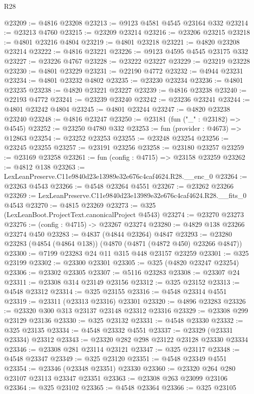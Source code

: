 \begin{lexlean}{R28}
\begin{coremodule}
@23209 := @4816 @23208
@23213 := @9123 @4581 @4545 @23164 @332
@23214 := @23213 @4760
@23215 := @23209 @23214
@23216 := @23206 @23215
@23218 := @4801 @23216 @4804
@23219 := @4801 @23218
@23221 := @4820 @23208 @23214
@23222 := @4816 @23221
@23226 := @9123 @4595 @4545 @23175 @332
@23227 := @23226 @4767
@23228 := @23222 @23227
@23229 := @23219 @23228
@23230 := @4801 @23229
@23231 := @22190 @4772
@23232 := @4944 @23231
@23234 := @4801 @23232 @4802
@23235 := @23230 @23234
@23236 := @4801 @23235
@23238 := @4820 @23221 @23227
@23239 := @4816 @23238
@23240 := @22193 @4772
@23241 := @23239 @23240
@23242 := @23236 @23241
@23244 := @4801 @23242 @4804
@23245 := @4801 @23244
@23247 := @4820 @23238 @23240
@23248 := @4816 @23247
@23250 := @23181 (fun ("_" : @23182) => @4545)
@23252 := @23250 @4780 @332
@23253 := fun (provider : @4673) => @12863
@23254 := @23252 @23253
@23255 := @23248 @23254
@23256 := @23245 @23255
@23257 := @23191 @23256
@23258 := @23180 @23257
@23259 := @23169 @23258
@23261 := fun (config : @4715) => @23158 @23259
@23262 := @4812 @138
@23263 := LexLeanPreserve.C11e9840d23e13989e32e676c4caf4624.R28.__enc_0
@23264 := @23263 @4543
@23266 := @4548 @23264 @4551
@23267 := @23262 @23266
@23269 := LexLeanPreserve.C11e9840d23e13989e32e676c4caf4624.R28.__fits_0 @4543
@23270 := @4815 @23269
@23273 := @325 (LexLeanBoot.ProjectText.canonicalProject @4543)
@23274 := @23270 @23273
@23276 := (config : @4715) -> @23267 @23274
@23280 := @4829 @138 @23266 @23274 @450
@23283 := @4837 (@4844 @23264) @4847
@23293 := @23280 @23283 (@4854 (@4864 @138)) (@4870 (@4871 (@4872 @450) @23266 @4847))
@23300 := @7199 @23283 @24 @11 @315 @448 @23157 @23259
@23301 := @325 @23199
@23302 := @23300 @23301
@23305 := @325 (@4820 @23247 @23254)
@23306 := @23302 @23305
@23307 := @5116 @23283
@23308 := @23307 @24
@23311 := @23308 @314 @23149 @23156
@23312 := @325 @23152
@23313 := @4548 @23312
@23314 := @325 @23155
@23316 := @4548 @23314 @4551
@23319 := @23311 (@23313 @23316) @23301
@23320 := @4896 @23283
@23326 := @23320 @300 @313 @23137 @23148 @23312 @23316
@23329 := @23308 @299 @23129 @23136
@23330 := @325 @23132
@23331 := @4548 @23330
@23332 := @325 @23135
@23334 := @4548 @23332 @4551
@23337 := @23329 (@23331 @23334) @23312
@23343 := @23320 @282 @298 @23122 @23128 @23330 @23334
@23346 := @23308 @281 @23114 @23121
@23347 := @325 @23117
@23348 := @4548 @23347
@23349 := @325 @23120
@23351 := @4548 @23349 @4551
@23354 := @23346 (@23348 @23351) @23330
@23360 := @23320 @264 @280 @23107 @23113 @23347 @23351
@23363 := @23308 @263 @23099 @23106
@23364 := @325 @23102
@23365 := @4548 @23364
@23366 := @325 @23105

\end{coremodule}
\end{lexlean}
